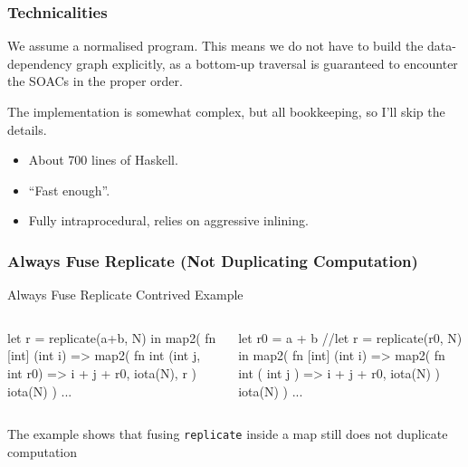 \documentclass{beamer}
\newcommand{\emp}[1]{\textcolor{DikuRed}{ #1}}
\begin{document}
\begin{frame}[fragile,t]
  \frametitle{Technicalities}

  We assume a normalised program.  This means we do not have to build
  the data-dependency graph explicitly, as a bottom-up traversal is
  guaranteed to encounter the SOACs in the proper order.

  The implementation is somewhat complex, but all bookkeeping, so I'll
  skip the details.

  \begin{itemize}
    \item About 700 lines of Haskell.
    \item ``Fast enough''.
    \item Fully intraprocedural, relies on aggressive inlining.
  \end{itemize}
\end{frame}

\begin{frame}[fragile]
  \frametitle{Always Fuse Replicate (Not Duplicating Computation)}

\begin{block}{ Always Fuse Replicate Contrived Example }
\begin{columns}
\vspace{-2ex}
\begin{colorcode}[fontsize=\scriptsize]
let \emp{r} = replicate(a+b, N) in
map2( fn [int] (int i) =>
        map2( fn int (int j, int r0)
                 => i + j + \emp{r0},
              iota(N), \emp{r}
            )
      iota(N)
    ) ...
\end{colorcode}
\vspace{-2ex}
\begin{colorcode}[fontsize=\scriptsize]
let \emp{r0} = a + b
//let \emp{r}  = replicate(r0, N) in
map2( fn [int] (int i) =>
        map2( fn int ( int j )
                  => i + j + \emp{r0},
              iota(N)
            )
      iota(N)
    ) ...
\end{colorcode}
\end{columns}
\end{block}

\bigskip

The example shows that fusing {\tt replicate} \emp{inside} a map
still does not duplicate computation

\end{frame}
\end{document}
